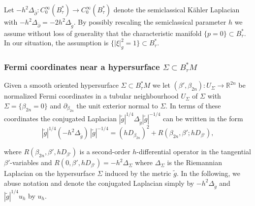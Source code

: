 \documentclass[11pt,reqno]{amsart}
\theoremstyle{definition}
\begin{document}
Let $ -h^2 \Delta_{\overline{\partial} }: C^{\infty}_0(B^*_{\tau}) \to C^{\infty}_0(B^*_{\tau})$ denote the semiclassical K\"ahler Laplacian with $-h^2 \Delta_{\overline{\partial}} = - 2 h^2 \Delta_{\tilde{g}}.$  By possibly rescaling the semiclassical parameter $h$ we assume without loss of generality that the characteristic manifold $\{p=0\}\subset B^*_\tau$. In our situation, the assumption is $\{ |\xi|^2_g=1\} \subset B^*_{\tau}$. 



\subsubsection{Fermi coordinates near a hypersurface $\Sigma \subset B_{\tau}^*M$} \label{FERMI}

Given a smooth oriented hypersurface $\Sigma \subset B_{\tau}^*M$ we let $(\beta',\beta_{2n}): U_{\Sigma} \to {\mathbb R}^{2n}$ be
normalized Fermi coordinates in a tubular neighbourhood $U_{\Sigma}$ of $\Sigma$ with $\Sigma = \{\beta_{2n}= 0 \}$ and
$\partial_{\beta_{2n}}$ the unit exterior normal to $\Sigma.$ In terms of these coordinates the conjugated Laplacian $ |\tilde{g}|^{1/4} \Delta_{\tilde{g}} |\tilde{g}|^{-1/4}$ can be written in the form
\begin{equation} \label{fermi expansion}
|\tilde{g}|^{1/4} (-h^2 \Delta_{\tilde{g}} ) \, |\tilde{g}|^{-1/4}= (h D_{\beta_{2n}})^2 + R(\beta_{2n},\beta'; hD_{\beta'}),
\end{equation}

where $R(\beta_{2n},\beta',hD_{\beta'})$ is a second-order $h$-differential operator in the tangential $\beta'$-variables and 
$R(0,\beta', hD_{\beta'}) =  -h^2 \Delta_{\Sigma}$ where $\Delta_{\Sigma}$ is the Riemannian Laplacian on the hypersurface $\Sigma$  induced by the metric $\tilde{g}.$ In the following, we abuse notation and denote the conjugated Laplacian simply by $-h^2 \Delta_{\tilde{g}}$ and $| \tilde{g}|^{1/4} u_h$ by $u_h.$


 
\end{document}

